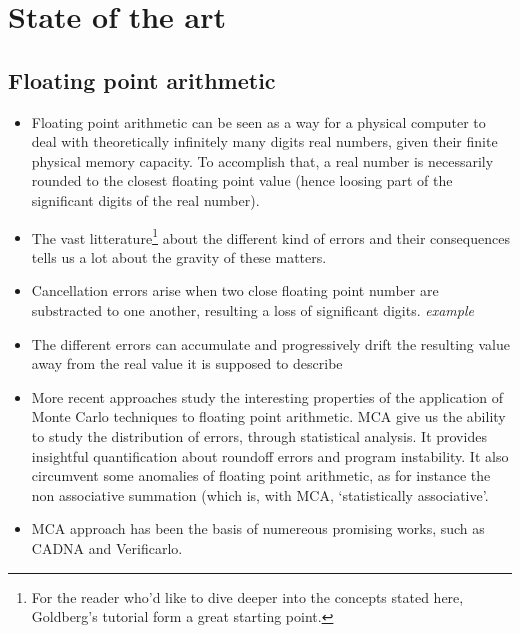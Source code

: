 \documentclass[a4paper,11pt]{article}
\let\cite=\supercite
\begin{document}
\section{State of the art} %
\subsection{Floating point arithmetic}
\begin{itemize}
  \item Floating point arithmetic can be seen as a way for a physical computer to deal with theoretically infinitely many digits real numbers, given their finite physical memory capacity. To accomplish that, a real number is necessarily rounded to the closest floating point value (hence loosing part of the significant digits of the real number).
  \item The vast litterature\footnote{For the reader who'd like to dive deeper into the concepts stated here, Goldberg's\cite{Goldberg1991} tutorial form a great starting point.} 
  about the different kind of errors and their consequences tells us a lot about the gravity of these matters. 
  \item Cancellation errors arise when two close floating point number are substracted to one another, resulting a loss of significant digits. \emph{example} 
  \item The different errors can accumulate and progressively drift the resulting value away from the real value it is supposed to describe %
  \item More recent approaches study the interesting properties of the application of Monte Carlo techniques to floating point arithmetic\cite{Parker1997}. MCA give us the ability to study the distribution of errors, through statistical analysis. It provides insightful quantification about roundoff errors and program instability. It also circumvent some anomalies of floating point arithmetic, as for instance the non associative summation (which is, with MCA, `statistically associative'.
  \item MCA approach has been the basis of numereous promising works, such as CADNA\cite{graillat2011stochastic} and Verificarlo\cite{denis:hal-01192668}.
\end{itemize}
\end{document}
